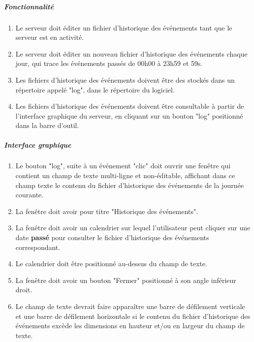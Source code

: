 \documentclass[10pt,a4paper]{report}
\begin{document}
	\subparagraph{Fonctionnalité}
		\begin{enumerate}
		
			\item Le serveur doit éditer un fichier d'historique des événements tant que le serveur est en activité.
		
			\item Le serveur doit éditer un nouveau fichier d'historique des événements chaque jour, qui trace les événements passés de 00h00 à 23h59 et 59s.
		
			\item Les fichiers d'historique des événements doivent être des stockés dans un répertoire appelé "log", dans le répertoire du logiciel.
		
			\item Les fichiers d'historique des événements doivent être consultable à partir de l'interface graphique du serveur, en cliquant sur un bouton "log" positionné dans la barre d'outil.
			
		\end{enumerate}
		
		\subparagraph{Interface graphique}
			\begin{enumerate}
		
			\item Le bouton "log", suite à un événement "clic" doit ouvrir une fenêtre qui contient un champ de texte multi-ligne et non-éditable, affichant dans ce champ texte le contenu du fichier d'historique des événements de la journée courante.
		
			\item La fenêtre doit avoir pour titre "Historique des événements".
		
			\item La fenêtre doit avoir un calendrier sur lequel l'utilisateur peut cliquer sur une date \textbf{passé} pour consulter le fichier d'historique des événements correspondant.
		
			\item Le calendrier doit être positionné au-dessus du champ de texte.
		
			\item La fenêtre doit avoir un bouton "Fermer" positionné à son angle inférieur droit.
			\item Le champ de texte devrait faire apparaître une barre de défilement verticale et une barre de défilement horizontale si le contenu du fichier d'historique des événements excède les dimensions en hauteur et/ou en largeur du champ de texte.
		\end{enumerate}
		
\end{document}
